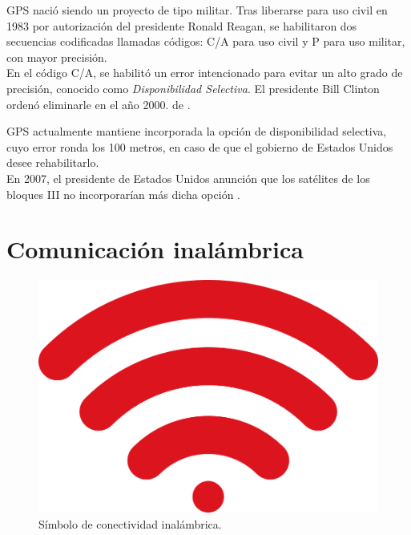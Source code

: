 GPS nació siendo un proyecto de tipo militar. Tras liberarse para uso civil en 1983 por autorización del presidente Ronald Reagan, se habilitaron dos secuencias codificadas llamadas códigos: C/A para uso civil y P para uso militar, con mayor precisión. \\

En el código C/A, se habilitó un error intencionado para evitar un alto grado de precisión, conocido como \textit{Disponibilidad Selectiva}. El presidente Bill Clinton ordenó eliminarle en el año 2000. de \cite{termal2014prototipo}.

GPS actualmente mantiene incorporada la opción de disponibilidad selectiva, cuyo error ronda los 100 metros, en caso de que el gobierno de Estados Unidos desee rehabilitarlo. \\

En 2007, el presidente de Estados Unidos anunción que los satélites de los bloques III no incorporarían más dicha opción \cite{chafer2017diseno}.

\section{Comunicación inalámbrica}

\begin{figure}[ht]
\centering
\includegraphics[scale=0.14]{Figures/wireless2}
\caption[Símbolo de conectividad inalámbrica.]{Símbolo de conectividad inalámbrica\footnotemark.}
\label{fig:ErrWrl}
\end{figure}


